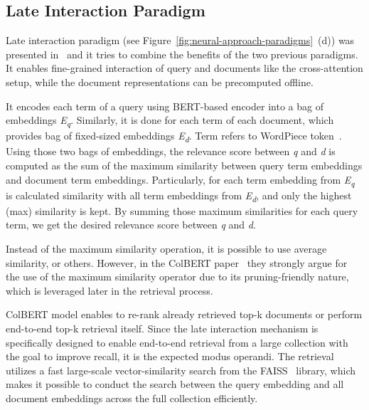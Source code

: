 \subsection{Late Interaction Paradigm} \label{section:colbert}
    Late interaction paradigm (see Figure~\ref{fig:neural-approach-paradigms}~(d)) was presented in~\parencite{colbert_2020} and it tries to combine the benefits of the two previous paradigms. It enables fine-grained interaction of query and documents like the cross-attention setup, while the document representations can be precomputed offline. 
    
    It encodes each term of a query using BERT-based encoder into a bag of embeddings \emph{E\textsubscript{q}}. Similarly, it is done for each term of each document, which provides bag of fixed-sized embeddings \emph{E\textsubscript{d}}. Term refers to WordPiece token~\parencite{wordpiece-tokenizer}. Using those two bags of embeddings, the relevance score between \emph{q} and \emph{d} is computed as the sum of the maximum similarity between query term embeddings and document term embeddings. Particularly, for each term embedding from \emph{E\textsubscript{q}} is calculated similarity with all term embeddings from \emph{E\textsubscript{d}}, and only the highest (max) similarity is kept. By summing those maximum similarities for each query term, we get the desired relevance score between \emph{q} and \emph{d}.
    
    Instead of the maximum similarity operation, it is possible to use average similarity, or others. However, in the ColBERT paper~\parencite{colbert_2020} they strongly argue for the use of the maximum similarity operator due to its pruning-friendly nature, which is leveraged later in the retrieval process.
    
    ColBERT model enables to re-rank already retrieved top-k documents or perform end-to-end top-k retrieval itself. Since the late interaction mechanism is specifically designed to enable end-to-end retrieval from a large collection with the goal to improve recall, it is the expected modus operandi. The retrieval utilizes a fast large-scale vector-similarity search from the FAISS~\parencite{Johnson_2019_faiss} library, which makes it possible to conduct the search between the query embedding and all document embeddings across the full collection efficiently. 
    
